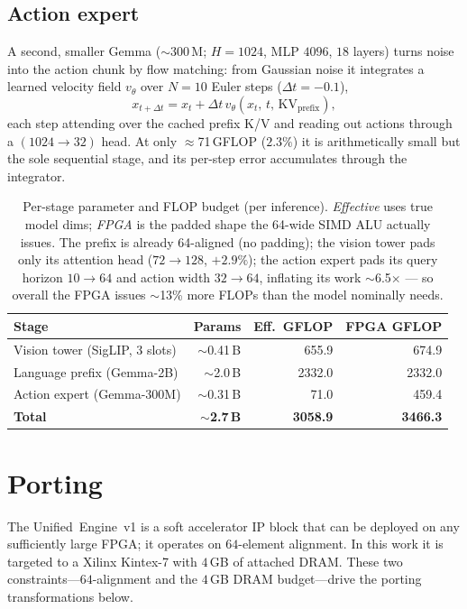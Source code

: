 \documentclass[11pt]{article}
\newcommand{\ue}{Unified~Engine}
\begin{document}
\subsection{Action expert}
A second, smaller Gemma ($\sim$300\,M; $H{=}1024$, MLP $4096$, $18$ layers)
turns noise into the action chunk by flow matching: from Gaussian noise it
integrates a learned velocity field $v_\theta$ over $N{=}10$ Euler steps
($\Delta t{=}-0.1$),
\begin{equation}
x_{t+\Delta t}=x_t+\Delta t\,v_\theta\!\left(x_t,\,t,\,\mathrm{KV}_{\text{prefix}}\right),
\label{eq:euler}
\end{equation}
each step attending over the cached prefix K/V and reading out actions through a
$(1024{\to}32)$ head. At only $\approx$71\,GFLOP ($2.3\%$) it is arithmetically
small but the sole sequential stage, and its per-step error accumulates through
the integrator.

\begin{table}[t]
\centering\small
\caption{Per-stage parameter and FLOP budget (per inference). \emph{Effective}
uses true model dims; \emph{FPGA} is the padded shape the 64-wide SIMD ALU
actually issues. The prefix is already 64-aligned (no padding); the vision
tower pads only its attention head ($72{\to}128$, $+2.9\%$); the action expert
pads its query horizon $10{\to}64$ and action width $32{\to}64$, inflating its
work $\sim$6.5$\times$ --- so overall the FPGA issues $\sim$13\% more FLOPs than
the model nominally needs.}
\label{tab:budget}
\begin{tabular}{@{}lrrr@{}}
\toprule
\textbf{Stage} & \textbf{Params} & \textbf{Eff.\ GFLOP} & \textbf{FPGA GFLOP} \\
\midrule
Vision tower (SigLIP, 3 slots) & $\sim$0.41\,B & 655.9 & 674.9 \\
Language prefix (Gemma-2B)     & $\sim$2.0\,B  & 2332.0 & 2332.0 \\
Action expert (Gemma-300M)     & $\sim$0.31\,B & 71.0 & 459.4 \\
\midrule
\textbf{Total} & \textbf{$\sim$2.7\,B} & \textbf{3058.9} & \textbf{3466.3} \\
\bottomrule
\end{tabular}
\end{table}

\section{Porting}
\label{sec:port}
The \ue{}~v1 is a soft accelerator IP block that can be deployed on any
sufficiently large FPGA; it operates on $64$-element alignment. In this work it
is targeted to a Xilinx Kintex-7 with $4$\,GB of attached DRAM. These two
constraints---$64$-alignment and the $4$\,GB DRAM budget---drive the porting
transformations below.
\end{document}
